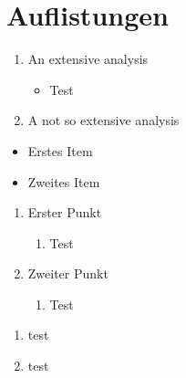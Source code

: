 \documentclass[10pt, a4paper]{article}
\begin{document}
\section{Auflistungen}
\blindtext
\begin{enumerate}
  \item  An extensive analysis 
   \begin{itemize}
     \item Test
   \end{itemize}
 \item A not so extensive analysis
\end{enumerate}

\blindtext

\begin{itemize}
  \item Erstes Item
  \item[\ding{43}] Zweites Item
\end{itemize}


\begin{enumerate}
  \item Erster Punkt
  \begin{enumerate}
    \item Test
  \end{enumerate}
  \item Zweiter Punkt
  \begin{enumerate}
    \item Test
  \end{enumerate}
\end{enumerate}


\begin{enumerate}
\item test
\item test
\end{enumerate}
\end{document}
